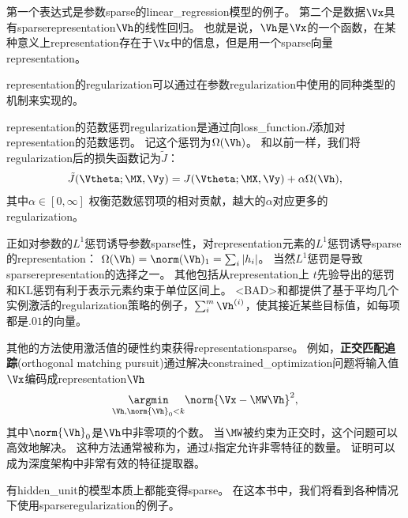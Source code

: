 
第一个表达式是参数\gls{sparse}的\gls{linear_regression}模型的例子。
第二个是数据$\Vx$具有\gls{sparse}\gls{representation}$\Vh$的线性回归。
也就是说，$\Vh$是$\Vx$的一个函数，在某种意义上\gls{representation}存在于$\Vx$中的信息，但是用一个\gls{sparse}向量\gls{representation}。

\gls{representation}的\gls{regularization}可以通过在参数\gls{regularization}中使用的同种类型的机制来实现的。

\gls{representation}的范数惩罚\gls{regularization}是通过向\gls{loss_function}$J$添加对\gls{representation}的范数惩罚。
记这个惩罚为$\Omega(\Vh)$。
和以前一样，我们将\gls{regularization}后的损失函数记为$\tilde J$：
\begin{align}
 \tilde J(\Vtheta; \MX, \Vy) =  J(\Vtheta; \MX, \Vy)  + \alpha \Omega(\Vh),
\end{align}
其中$\alpha \in [0, \infty]$ 权衡范数惩罚项的相对贡献，越大的$\alpha$对应更多的\gls{regularization}。

正如对参数的$L^1$惩罚诱导参数\gls{sparse}性，对\gls{representation}元素的$L^1$惩罚诱导\gls{sparse}的\gls{representation}：
$\Omega(\Vh) = \norm(\Vh)_1 = \sum_i |h_i|$。
当然$L^1$惩罚是导致\gls{sparse}\gls{representation}的选择之一。
其他包括从\gls{representation}上 $t$先验导出的惩罚\citep{Olshausen+Field-1996,Bergstra-Phd-2011}和\gls{KL}惩罚\citep{Larochelle+Bengio-2008}有利于表示元素约束于单位区间上。
<BAD>\cite{HonglakL2008-small}和\cite{Goodfellow2009}都提供了基于平均几个实例激活的\gls{regularization}策略的例子，$\sum_i^m \Vh^{(i)}$，使其接近某些目标值，如每项都是$.01$的向量。

其他的方法使用激活值的硬性约束获得\gls{representation}\gls{sparse}。
例如，\textbf{正交匹配追踪}(orthogonal matching pursuit)\citep{pati93orthogonal}通过解决\gls{constrained_optimization}问题将输入值$\Vx$编码成\gls{representation}$\Vh$
\begin{align}
 \underset{\Vh, \norm{\Vh}_0 < k}{\argmin} \norm{\Vx - \MW \Vh}^2,
\end{align}
其中$\norm{\Vh}_0 $是$\Vh$中非零项的个数。
当$\MW$被约束为正交时，这个问题可以高效地解决。
这种方法通常被称为，通过$k$指定允许非零特征的数量。
\cite{Coates2011b}证明可以成为深度架构中非常有效的特征提取器。


有\gls{hidden_unit}的模型本质上都能变得\gls{sparse}。
在这本书中，我们将看到各种情况下使用\gls{sparse}\gls{regularization}的例子。

